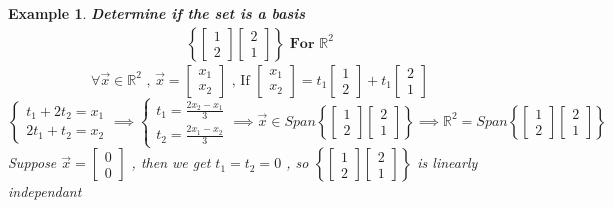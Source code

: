 \documentclass{article}
\newtheorem{ex}[theorem]{Example}
\begin{document}
\begin{ex} \textbf{Determine if the set is a basis} \\
\[\begin{aligned} \left\{ \begin{bmatrix} 1 \\ 2 \end{bmatrix} \begin{bmatrix} 2 \\ 1 \end{bmatrix} \right\} \textbf{ For } \mathbb{R}^2 \end{aligned} \]
\[ \forall \vec{x} \in \mathbb{R}^2 \text{ , } \vec{x} = \begin{bmatrix} x_1 \\ x_2 \end{bmatrix} \text{ ,  If }  \begin{bmatrix} x_1 \\ x_2 \end{bmatrix} = t_1 \begin{bmatrix} 1 \\ 2 \end{bmatrix} + t_1 \begin{bmatrix} 2 \\ 1 \end{bmatrix} \]
\[ \begin{cases} t_1 + 2t_2 = x_1 \\ 2t_1 + t_2 = x_2 \end{cases}  \implies \begin{cases} t_1 = \frac{2x_2 - x_1}{3} \\ t_2 = \frac{2x_1- x_2}{3} \end{cases}  \implies \vec{x} \in Span\left\{ \begin{bmatrix} 1 \\ 2 \end{bmatrix} \begin{bmatrix} 2 \\ 1 \end{bmatrix} \right\} \implies \mathbb{R}^2 = Span \left\{ \begin{bmatrix} 1 \\ 2 \end{bmatrix} \begin{bmatrix} 2 \\ 1 \end{bmatrix} \right\}\]
Suppose \( \vec{x} = \begin{bmatrix} 0 \\ 0 \end{bmatrix} \) , then we get \( t_1 = t_2 = 0 \) , so \( \left\{ \begin{bmatrix} 1 \\ 2 \end{bmatrix} \begin{bmatrix} 2 \\ 1 \end{bmatrix} \right\} \) is linearly independant
\end {ex}
\end{document}
